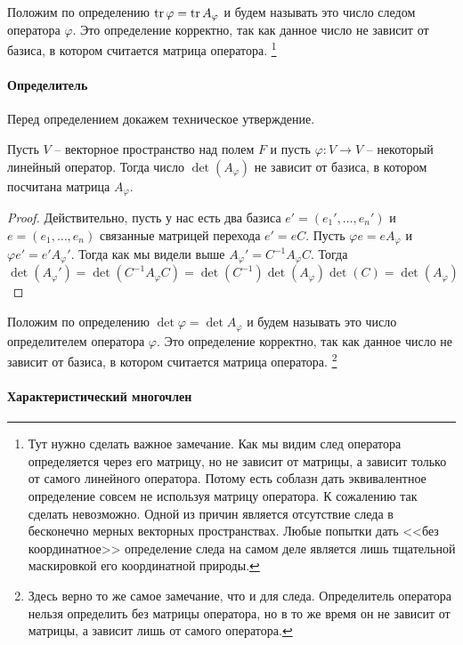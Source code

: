 Положим по определению $\operatorname{tr}\varphi = \operatorname{tr} A_\varphi$ и будем называть это число следом оператора $\varphi$.
Это определение корректно, так как данное число не зависит от базиса, в котором считается матрица оператора.%
\footnote{Тут нужно сделать важное замечание.
Как мы видим след оператора определяется через его матрицу, но не зависит от матрицы, а зависит только от самого линейного оператора.
Потому есть соблазн дать эквивалентное определение совсем не используя матрицу оператора.
К сожалению так сделать невозможно.
Одной из причин является отсутствие следа в бесконечно мерных векторных пространствах.
Любые попытки дать <<без координатное>> определение следа на самом деле является лишь тщательной маскировкой его координатной природы.}

\paragraph{Определитель}

Перед определением докажем техническое утверждение.

\begin{claim*}
Пусть $V$ -- векторное пространство над полем $F$ и пусть $\varphi\colon V\to V$ -- некоторый линейный оператор.
Тогда число $\det(A_\varphi)$ не зависит от базиса, в котором посчитана матрица $A_\varphi$.
\end{claim*}
\begin{proof}
Действительно, пусть у нас есть два базиса $e' = (e_1',\ldots,e_n')$ и $e = (e_1,\ldots,e_n)$ связанные матрицей перехода $e' = eC$.
Пусть $\varphi e = eA_\varphi$ и $\varphi e' = e' A_\varphi'$.
Тогда как мы видели выше $A_\varphi' = C^{-1} A_\varphi C$.
Тогда
\[
\det(A_\varphi') = \det (C^{-1}A_\varphi C) = \det(C^{-1})\det(A_\varphi)\det(C) =\det(A_\varphi)
\]
\end{proof}

Положим по определению $\det\varphi = \det A_\varphi$ и будем называть это число определителем оператора $\varphi$.
Это определение корректно, так как данное число не зависит от базиса, в котором считается матрица оператора.%
\footnote{Здесь верно то же самое замечание, что и для следа.
Определитель оператора нельзя определить без матрицы оператора, но в то же время он не зависит от матрицы, а зависит лишь от самого оператора.}

\paragraph{Характеристический многочлен}

